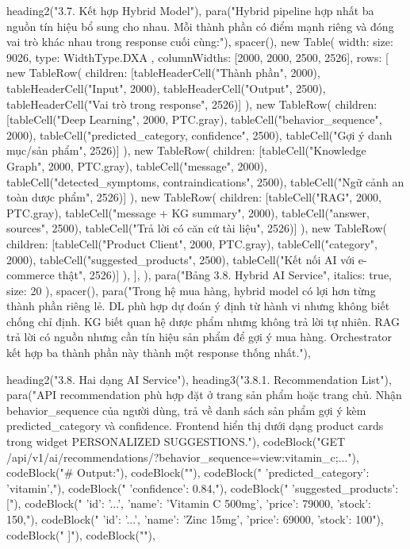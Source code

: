 {{{  heading2("3.7. Kết hợp Hybrid Model"),
  para("Hybrid pipeline hợp nhất ba nguồn tín hiệu bổ sung cho nhau. Mỗi thành phần có điểm mạnh riêng và đóng vai trò khác nhau trong response cuối cùng:"),
  spacer(),
  new Table({
    width: { size: 9026, type: WidthType.DXA },
    columnWidths: [2000, 2000, 2500, 2526],
    rows: [
      new TableRow({ children: [tableHeaderCell("Thành phần", 2000), tableHeaderCell("Input", 2000), tableHeaderCell("Output", 2500), tableHeaderCell("Vai trò trong response", 2526)] }),
      new TableRow({ children: [tableCell("Deep Learning", 2000, PTC.gray), tableCell("behavior_sequence", 2000), tableCell("predicted_category, confidence", 2500), tableCell("Gợi ý danh mục/sản phẩm", 2526)] }),
      new TableRow({ children: [tableCell("Knowledge Graph", 2000, PTC.gray), tableCell("message", 2000), tableCell("detected_symptoms, contraindications", 2500), tableCell("Ngữ cảnh an toàn dược phẩm", 2526)] }),
      new TableRow({ children: [tableCell("RAG", 2000, PTC.gray), tableCell("message + KG summary", 2000), tableCell("answer, sources", 2500), tableCell("Trả lời có căn cứ tài liệu", 2526)] }),
      new TableRow({ children: [tableCell("Product Client", 2000, PTC.gray), tableCell("category", 2000), tableCell("suggested_products", 2500), tableCell("Kết nối AI với e-commerce thật", 2526)] }),
    ],
  }),
  para("Bảng 3.8. Hybrid AI Service", { italics: true, size: 20 }),
  spacer(),
  para("Trong hệ mua hàng, hybrid model có lợi hơn từng thành phần riêng lẻ. DL phù hợp dự đoán ý định từ hành vi nhưng không biết chống chỉ định. KG biết quan hệ dược phẩm nhưng không trả lời tự nhiên. RAG trả lời có nguồn nhưng cần tín hiệu sản phẩm để gợi ý mua hàng. Orchestrator kết hợp ba thành phần này thành một response thống nhất."),

  heading2("3.8. Hai dạng AI Service"),
  heading3("3.8.1. Recommendation List"),
  para("API recommendation phù hợp đặt ở trang sản phẩm hoặc trang chủ. Nhận behavior_sequence của người dùng, trả về danh sách sản phẩm gợi ý kèm predicted_category và confidence. Frontend hiển thị dưới dạng product cards trong widget PERSONALIZED SUGGESTIONS."),
  codeBlock("GET /api/v1/ai/recommendations/?behavior_sequence=view:vitamin_c;..."),
  codeBlock("# Output:"),
  codeBlock("{"),
  codeBlock("  'predicted_category': 'vitamin',"),
  codeBlock("  'confidence': 0.84,"),
  codeBlock("  'suggested_products': ["),
  codeBlock("    {'id': '...', 'name': 'Vitamin C 500mg', 'price': 79000, 'stock': 150},"),
  codeBlock("    {'id': '...', 'name': 'Zinc 15mg', 'price': 69000, 'stock': 100}"),
  codeBlock("  ]"),
  codeBlock("}"),

}}}
